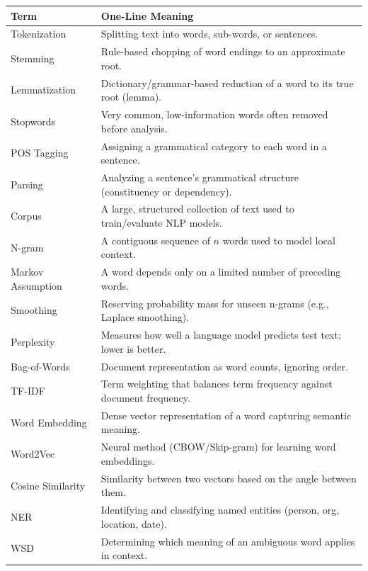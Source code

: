 \documentclass[11pt,a4paper]{article}
\begin{document}
\begin{longtable}{@{}p{3.3cm}p{10.2cm}@{}}
\toprule
\rowcolor{primary!15}
\textbf{Term} & \textbf{One-Line Meaning} \\
\midrule
\endhead
Tokenization & Splitting text into words, sub-words, or sentences. \\
\addlinespace
Stemming & Rule-based chopping of word endings to an approximate root. \\
\addlinespace
Lemmatization & Dictionary/grammar-based reduction of a word to its true root (lemma). \\
\addlinespace
Stopwords & Very common, low-information words often removed before analysis. \\
\addlinespace
POS Tagging & Assigning a grammatical category to each word in a sentence. \\
\addlinespace
Parsing & Analyzing a sentence's grammatical structure (constituency or dependency). \\
\addlinespace
Corpus & A large, structured collection of text used to train/evaluate NLP models. \\
\addlinespace
N-gram & A contiguous sequence of $n$ words used to model local context. \\
\addlinespace
Markov Assumption & A word depends only on a limited number of preceding words. \\
\addlinespace
Smoothing & Reserving probability mass for unseen n-grams (e.g., Laplace smoothing). \\
\addlinespace
Perplexity & Measures how well a language model predicts test text; lower is better. \\
\addlinespace
Bag-of-Words & Document representation as word counts, ignoring order. \\
\addlinespace
TF-IDF & Term weighting that balances term frequency against document frequency. \\
\addlinespace
Word Embedding & Dense vector representation of a word capturing semantic meaning. \\
\addlinespace
Word2Vec & Neural method (CBOW/Skip-gram) for learning word embeddings. \\
\addlinespace
Cosine Similarity & Similarity between two vectors based on the angle between them. \\
\addlinespace
NER & Identifying and classifying named entities (person, org, location, date). \\
\addlinespace
WSD & Determining which meaning of an ambiguous word applies in context. \\

\end{longtable}
\end{document}
